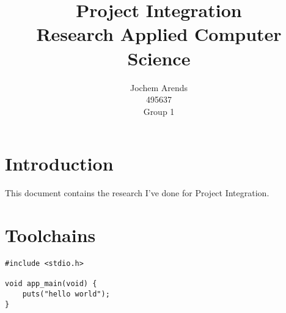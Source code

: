 \documentclass{article}
\title{Project Integration \\ Research Applied Computer Science}
\author{Jochem Arends \\ 495637 \\ Group 1}
\begin{document}
\maketitle
\newpage

\tableofcontents
\newpage

\section{Introduction}
This document contains the research I've done for Project Integration.

\section{Toolchains}

\begin{verbatim}
#include <stdio.h>

void app_main(void) {
    puts("hello world");
}
\end{verbatim}
\cite{test}


\newpage

\end{document}

